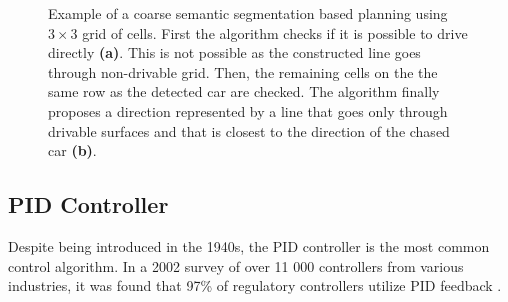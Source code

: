 \documentclass{ctuthesis/ctuthesis}
\begin{document}
\begin{figure}[]
    \centering
    \qquad
    \caption[Example of a coarse semantic segmentation based planning using $3\times 3$ grid of cells]{Example of a coarse semantic segmentation based planning using $3\times 3$ grid of cells. First the algorithm checks if it is possible to drive directly \textbf{(a)}. This is not possible as the constructed line goes through non-drivable grid. Then, the remaining cells on the the same row as the detected car are checked. The algorithm finally proposes a direction represented by a line that goes only through drivable surfaces and that is closest to the direction of the chased car \textbf{(b)}.}%
    \label{fig:segmentation_planning}%
\end{figure}

\subsection{PID Controller}
Despite being introduced in the 1940s, the PID controller is the most common control algorithm. In a 2002 survey of over 11 000 controllers from various industries, it was found that 97\% of regulatory controllers utilize PID feedback \cite{PID-usage}. 
\end{document}
